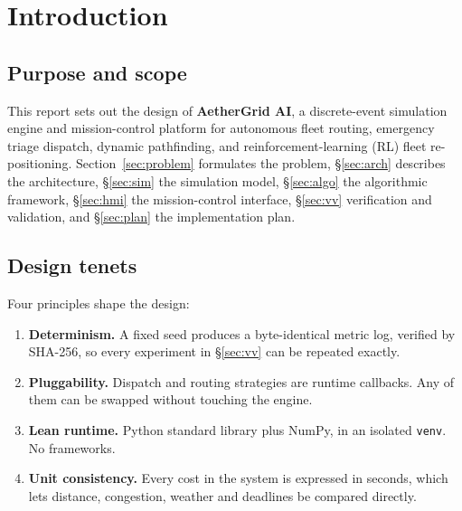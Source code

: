 \documentclass[11pt,a4paper]{article}
\theoremstyle{spaceddef}
\theoremstyle{spacedplain}
\begin{document}
\tableofcontents
\listoffigures
\listoftables
\newpage

\section{Introduction}

\subsection{Purpose and scope}
This report sets out the design of \textbf{AetherGrid AI}, a discrete-event
simulation engine and mission-control platform for autonomous fleet routing,
emergency triage dispatch, dynamic pathfinding, and reinforcement-learning (RL)
fleet re-positioning. Section~\ref{sec:problem} formulates the problem,
\S\ref{sec:arch} describes the architecture, \S\ref{sec:sim} the simulation
model, \S\ref{sec:algo} the algorithmic framework, \S\ref{sec:hmi} the
mission-control interface, \S\ref{sec:vv} verification and validation, and
\S\ref{sec:plan} the implementation plan.

\subsection{Design tenets}
Four principles shape the design:
\begin{enumerate}[leftmargin=1.6em,itemsep=2pt]
  \item \textbf{Determinism.} A fixed seed produces a byte-identical metric log,
        verified by SHA-256, so every experiment in \S\ref{sec:vv} can be repeated exactly.
  \item \textbf{Pluggability.} Dispatch and routing strategies are runtime callbacks.
        Any of them can be swapped without touching the engine.
  \item \textbf{Lean runtime.} Python standard library plus NumPy, in an isolated
        \texttt{venv}. No frameworks.
  \item \textbf{Unit consistency.} Every cost in the system is expressed in seconds,
        which lets distance, congestion, weather and deadlines be compared directly.
\end{enumerate}
\end{document}
